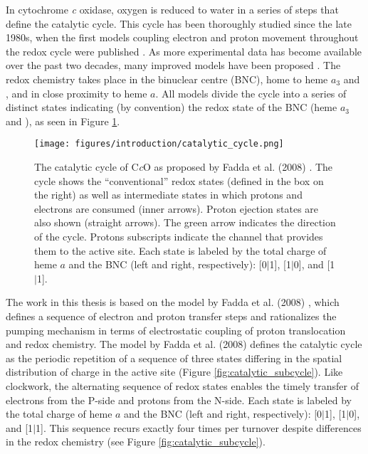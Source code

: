 In cytochrome \emph{c} oxidase, oxygen is reduced to water in a series of steps that define the catalytic cycle. This cycle has been thoroughly studied since the late 1980s, when the first models coupling electron and proton movement throughout the redox cycle were published \cite{Wikstrom:1988p10232}. As more experimental data has become available over the past two decades, many improved models have been proposed \cite{Michel:1999p5651,Wikstrom:2000p9864,Wikstrom:2002p5573,Nyquist:2003p5405,Bloch:2004p5454,Gennis:2004p10239,Verkhovsky:2006p5339,Fadda:2008p5482}. The redox chemistry takes place in the binuclear centre (BNC), home to heme $a_3$ and , and in close proximity to heme $a$. All models divide the cycle into a series of distinct states indicating (by convention) the redox state of the BNC (heme $a_3$ and ), as seen in Figure \ref{fig:catalytic_cycle}.
\begin{figure}[htbp]
\centering
\texttt{[image: figures/introduction/catalytic\_cycle.png]}
\caption[The catalytic cycle of cytochrome \emph{c} oxidase.]{The catalytic cycle of C\emph{c}O as proposed by Fadda et al. (2008) \cite{Fadda:2008p5482}. The cycle shows the ``conventional'' redox states (defined in the box on the right) as well as intermediate states in which protons and electrons are consumed (inner arrows). Proton ejection states are also shown (straight arrows). The green arrow indicates the direction of the cycle. Protons subscripts indicate the channel that provides them to the active site. Each state is labeled by the total charge of heme $a$ and the BNC (left and right, respectively): [0$\mid$1], [1$\mid$0], and [1$\mid$1].}
\label{fig:catalytic_cycle}
\end{figure}

The work in this thesis is based on the model by Fadda et al. (2008) \cite{Fadda:2008p5482}, which defines a sequence of electron and proton transfer steps and rationalizes the pumping mechanism in terms of electrostatic coupling of proton translocation and redox chemistry. The model by Fadda et al. (2008) \cite{Fadda:2008p5482} defines the catalytic cycle as the periodic repetition of a sequence of three states differing in the spatial distribution of charge in the active site (Figure \ref{fig:catalytic_subcycle}). Like clockwork, the alternating sequence of redox states enables the timely transfer of electrons from the P-side and protons from the N-side. Each state is labeled by the total charge of heme $a$ and the BNC (left and right, respectively): [0$\mid$1], [1$\mid$0], and [1$\mid$1]. This sequence recurs exactly four times per turnover despite differences in the redox chemistry (see Figure \ref{fig:catalytic_subcycle}).

